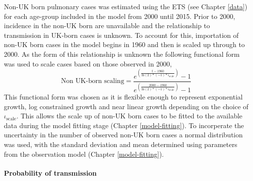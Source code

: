 \documentclass[11pt,twoside]{bristolthesis}
\begin{document}
  Non-UK born pulmonary cases was estimated using the ETS (see Chapter \ref{data}) for each age-group included in the model from 2000 until 2015. Prior to 2000, incidence in the non-UK born are unavailable and the relationship to transmission in UK-born cases is unknown. To account for this, importation of non-UK born cases in the model begins in 1960 and then is scaled up through to 2000. As the form of this relationship is unknown the following functional form was used to scale cases based on those observed in 2000,
  \begin{equation}
  \text{Non UK-born scaling} = \frac{e^{\left(\frac{t - 1960}{\text{ln}(2) * (-1) * \iota_{\text{scale}}}\right)} - 1}{e^{\left(\frac{2000 - 1960}{\text{ln}(2) * (-1) * \iota_{\text{scale}}}\right)} - 1}
    \label{eq:non-uk-born-scale}
  \end{equation}
  This functional form was chosen as it is flexible enough to represent exponential growth, log constrained growth and near linear growth depending on the choice of \(\iota_{\text{scale}}\). This allows the scale up of non-UK born cases to be fitted to the available data during the model fitting stage (Chapter \ref{model-fitting}). To incorperate the uncertainty in the number of observed non-UK born cases a normal distribution was used, with the standard deviation and mean determined using parameters from the observation model (Chapter \ref{model-fitting}).
  
  \hypertarget{probability-of-transmission}{%
  \paragraph{Probability of transmission}\label{probability-of-transmission}}
  
\end{document}
